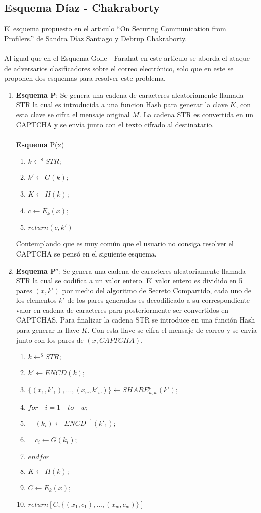 \subsection{Esquema Díaz - Chakraborty}
El esquema propuesto en el articulo ``On Securing Communication from Profilers.'' de Sandra Díaz Santiago y Debrup Chakraborty.\cite{clas}\\\\
Al igual que en el Esquema Golle - Farahat en este articulo se aborda el ataque de adversarios clasificadores sobre el correo electrónico, solo que en este se proponen dos esquemas para resolver este problema.
\begin{enumerate}
 \item \textbf{Esquema P}: Se genera una cadena de caracteres aleatoriamente llamada STR la cual es introducida a una funcion Hash para generar la clave $K$, con esta clave se cifra el mensaje original $M$. La cadena STR es convertida en un CAPTCHA y se envía junto con el texto cifrado al destinatario.\\\\
 \textbf{Esquema} P(x)
 \begin{enumerate}
  \item $k\longleftarrow^\$ STR;$
  \item $k'\longleftarrow G(k);$
  \item $K\longleftarrow H(k);$
  \item $c\longleftarrow E_k(x);$
  \item $return(c,k')$
 \end{enumerate}
 Contemplando que es muy común que el usuario no consiga resolver el CAPTCHA se pensó en el siguiente esquema.
 \item \textbf{Esquema P'}: Se genera una cadena de caracteres aleatoriamente llamada STR la cual se codifica a un valor entero. El valor entero es dividido en 5 pares $(x,k')$ por medio del algoritmo de Secreto Compartido, cada uno de los elementos $k'$ de los pares generados es decodificado a su correspondiente valor en cadena de caracteres para posteriormente ser convertidos en CAPTCHAS. Para finalizar la cadena STR se introduce en una función Hash para generar la llave $K$. Con esta llave se cifra el mensaje de correo y se envía junto con los pares de $(x,CAPTCHA)$.
 \begin{enumerate}
  \item $k\longleftarrow^\$STR;$
  \item $k'\longleftarrow ENCD(k);$
  \item $\{(x_1,k'_1),...,(x_w,k'_w)\}\longleftarrow SHARE^p_{u,w}(k');$
  \item $for\quad i=1\quad to \quad w;$
  \item $\quad (k_i)\longleftarrow ENCD^{-1}(k'_1);$
  \item $\quad c_i\longleftarrow G(k_i);$
  \item $end for$
  \item $K\longleftarrow H(k);$
  \item $C\longleftarrow E_k(x);$
  \item $return [C,\{(x_1,c_1),...,(x_w,c_w)\}]$
 \end{enumerate}

\end{enumerate}
